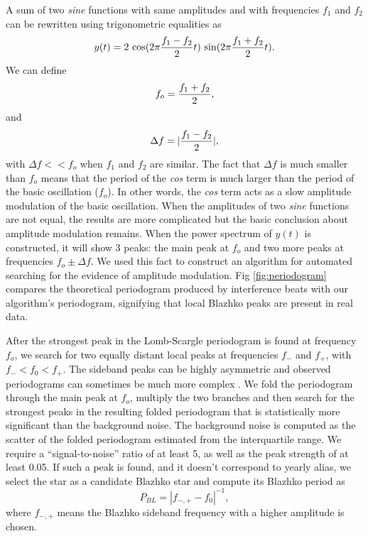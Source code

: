 A sum of two {\it sine} functions with same amplitudes and with frequencies $f_1$ and $f_2$ can be rewritten 
using trigonometric equalities as 
\begin{equation}
         y(t) = 2 \, \cos(2\pi{f_1-f_2\over 2} t) \, \sin(2\pi {f_1+f_2\over 2} t).
\end{equation} 
We can define 
\begin{equation}
\label{eq:fo}
         f_o = {f_1+f_2\over 2},
\end{equation} 
and 
\begin{equation}
\label{eq:Df}
         \Delta f = |{f_1-f_2\over 2}|,
\end{equation} 
with $\Delta f << f_o$ when $f_1$ and $f_2$ are similar. The fact that $\Delta f$ is much smaller than $f_o$ means
that the period of the {\it cos} term
is much larger than the period of the basic oscillation ($f_o$). In other words, the {\it cos} term acts as a slow
amplitude modulation of the basic oscillation. When the amplitudes of two {\it sine} functions are not equal, the
results are more complicated but the basic conclusion about amplitude modulation remains.
When the power spectrum of $y(t)$ is constructed, it will show 3 peaks: the main peak at $f_o$ and
two more peaks at frequencies $f_o \pm \Delta f$. We used this fact to construct an algorithm for
automated searching for the evidence of amplitude  modulation. 
Fig \ref{fig:periodogram} compares the theoretical periodogram produced by interference beats with our algorithm's periodogram,
signifying that local Blazhko peaks are present in real data.


After the strongest peak in the Lomb-Scargle periodogram is found at frequency $f_o$, we search for  two equally
distant local peaks at frequencies $f_-$ and $f_+$, with $f_- < f_0 < f_+$.  The sideband peaks can be highly asymmetric
\cite{2003ApJ...598..597A} and observed periodograms can sometimes be much more complex \cite{2007MNRAS.377.1263S}.  
We fold the periodogram through the main peak at $f_o$, multiply the two branches and then search for the strongest peaks
in the resulting folded periodogram that is statistically more significant than the background noise. The background noise
is computed as the scatter of the folded periodogram estimated from the interquartile range. We require a ``signal-to-noise''
ratio of at least 5, as well as the peak strength of at least 0.05. 
If such a peak is found,
and it doesn't correspond to yearly alias, we select the star as a candidate Blazhko star and compute
its Blazhko period as 
\begin{equation*}
P_{BL} = |f_{-,+} - f_0|^{-1},
\end{equation*}
where $f_{-,+}$ means the Blazhko sideband frequency with a higher amplitude is chosen. 

